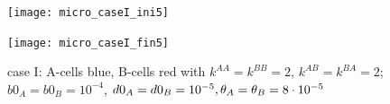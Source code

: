 \begin{figure}[htb]
	\begin{minipage}[t]{.45\textwidth}
		\centering
		\texttt{[image: micro\_caseI\_ini5]}
	\end{minipage}
	\hfill
	\begin{minipage}[t]{.45\textwidth}
		\centering
		\texttt{[image: micro\_caseI\_fin5]}
	\end{minipage}  
	\label{fig:1-2}
	\caption{{case I: A-cells blue, B-cells red with $k^{AA}=k^{BB}=2 $, $k^{AB}=k^{BA}=2$; $b0_A=b0_B=10^{-4}$, $d0_A=d0_B=10^{-5}, {\theta}_A={\theta}_B=8\cdot 10^{-5}$}}
\end{figure}








